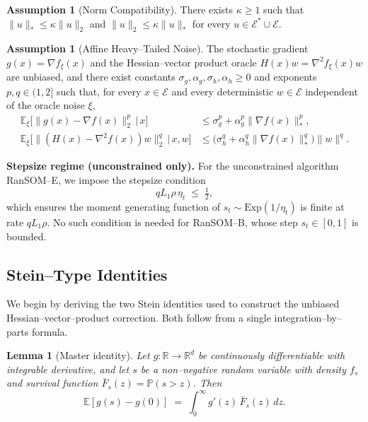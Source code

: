 \documentclass{article}
\theoremstyle{plain}
\newtheorem{lemma}[theorem]{Lemma}
\theoremstyle{definition}
\newtheorem{assumption}[theorem]{Assumption}
\theoremstyle{remark}
\begin{document}
\begin{assumption}[Norm Compatibility]
\label{ass:app:kappa}
There exists $\kappa \geq 1$ such that $\|u\|_* \leq \kappa \|u\|_2$ and
$\|u\|_2 \leq \kappa \|u\|_*$ for every $u \in \mathcal{E}^* \cup
\mathcal{E}$.
\end{assumption}

\begin{assumption}[Affine Heavy--Tailed Noise]
\label{ass:app:noise}
The stochastic gradient $g(x) = \nabla f_\xi(x)$ and the Hessian--vector
product oracle $H(x)w = \nabla^2 f_\xi(x) w$ are unbiased, and there
exist constants $\sigma_g, \alpha_g, \sigma_h, \alpha_h \geq 0$ and
exponents $p, q \in (1, 2]$ such that, for every $x \in \mathcal{E}$ and
every deterministic $w \in \mathcal{E}$ independent of the oracle noise
$\xi$,
\begin{align}
  \mathbb{E}_\xi\bigl[\|g(x) - \nabla f(x)\|_2^p \,\big|\, x\bigr]
    &\leq \sigma_g^p + \alpha_g^p \|\nabla f(x)\|_*^p,
  \label{eq:app:noise-g} \\
  \mathbb{E}_\xi\bigl[\|(H(x) - \nabla^2 f(x))w\|_2^q \,\big|\, x, w\bigr]
    &\leq \bigl(\sigma_h^q + \alpha_h^q \|\nabla f(x)\|_*^q\bigr) \|w\|^q.
  \label{eq:app:noise-h}
\end{align}
\end{assumption}

\smallskip\noindent\textbf{Stepsize regime (unconstrained only).}
For the unconstrained algorithm RanSOM--E, we impose the stepsize
condition
\begin{equation}
  q L_1 \rho\, \eta_t \;\leq\; \tfrac12,
  \label{eq:app:stepsize-mgf}
\end{equation}
which ensures the moment generating function of $s_t \sim
\mathrm{Exp}(1/\eta_t)$ is finite at rate $qL_1\rho$. No such condition
is needed for RanSOM--B, whose step $s_t \in [0,1]$ is bounded.

\subsection{Stein--Type Identities}
\label{app:stein}

We begin by deriving the two Stein identities used to construct the
unbiased Hessian--vector--product correction. Both follow from a single
integration--by--parts formula.

\begin{lemma}[Master identity]
\label{lem:app:master}
Let $g : \mathbb{R} \to \mathbb{R}^d$ be continuously differentiable with
integrable derivative, and let $s$ be a non--negative random variable
with density $f_s$ and survival function $\bar F_s(z) = \mathbb{P}(s >
z)$. Then
\begin{equation}
  \mathbb{E}[g(s) - g(0)]
  \;=\; \int_0^\infty g'(z)\, \bar F_s(z)\, dz.
  \label{eq:app:master}
\end{equation}
\end{lemma}
\end{document}
